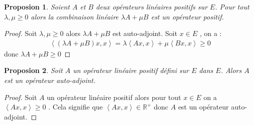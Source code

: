 \documentclass{report}
\newtheorem{Prop}{Proposion}[subsection]
\begin{document}
{\begin{Prop} Soient $A$ et $B$ deux opérateurs linéaires positifs sur $E$. Pour tout $\lambda, \mu \ge 0$ alors la combinaison linéaire $\lambda A + \mu B$ est un opérateur positif.\\
\end{Prop}
\begin{proof}
Soit $\lambda, \mu \ge 0$ alors $\lambda A + \mu B$ est auto-adjoint. Soit $x \in E$ , on a : 
					\begin{align*}
					 \left< (\lambda A + \mu B)x,x \right> = \lambda\left< Ax,x \right> + \mu \left< Bx,x \right> \ge 0
					\end{align*}
donc $\lambda A + \mu B \ge 0$ 
\end{proof}




\begin{Prop} Soit $A$ un opérateur linéaire positif défini sur $E$ dans $E$. Alors $A$ est un opérateur auto-adjoint.\\
\end{Prop}
\begin{proof}
Soit $A$ un opérateur linéaire positif alors pour tout $x \in E$ on a $\left< Ax,x \right> \ge 0$ . Cela signifie que $\left< Ax,x \right> \in \mathbb{R^+}$ donc $A$ est un opérateur auto-adjoint.
\end{proof}


}
\end{document}
